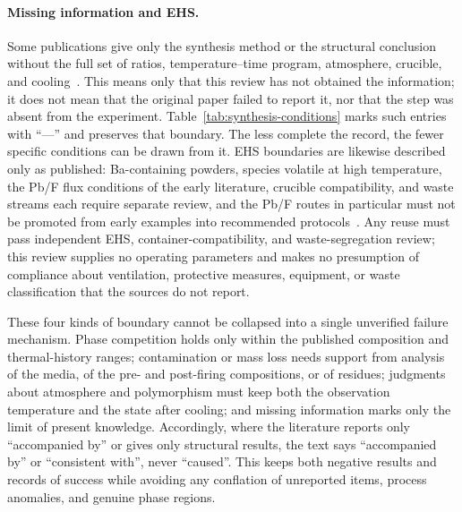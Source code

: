 \paragraph{Missing information and EHS.}
Some publications give only the synthesis method or the structural conclusion without the full set of ratios, temperature--time program, atmosphere, crucible, and cooling~\cite{ababaikeri2024ba5y12zn,ababaikeri2024ba3zn4si4o15,kaiser2002crystal,cai2024optimized,zhao2026crystal}. This means only that this review has not obtained the information; it does not mean that the original paper failed to report it, nor that the step was absent from the experiment. Table~\ref{tab:synthesis-conditions} marks such entries with ``---'' and preserves that boundary. The less complete the record, the fewer specific conditions can be drawn from it. EHS boundaries are likewise described only as published: Ba-containing powders, species volatile at high temperature, the Pb\slash F flux conditions of the early literature, crucible compatibility, and waste streams each require separate review, and the Pb\slash F routes in particular must not be promoted from early examples into recommended protocols~\cite{giess1982zn2sio4}. Any reuse must pass independent EHS, container-compatibility, and waste-segregation review; this review supplies no operating parameters and makes no presumption of compliance about ventilation, protective measures, equipment, or waste classification that the sources do not report.

These four kinds of boundary cannot be collapsed into a single unverified failure mechanism. Phase competition holds only within the published composition and thermal-history ranges; contamination or mass loss needs support from analysis of the media, of the pre- and post-firing compositions, or of residues; judgments about atmosphere and polymorphism must keep both the observation temperature and the state after cooling; and missing information marks only the limit of present knowledge. Accordingly, where the literature reports only ``accompanied by'' or gives only structural results, the text says ``accompanied by'' or ``consistent with'', never ``caused''. This keeps both negative results and records of success while avoiding any conflation of unreported items, process anomalies, and genuine phase regions.
